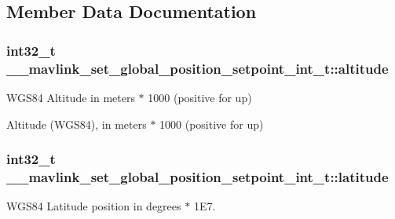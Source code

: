 \subsection{Member Data Documentation}
\hypertarget{struct____mavlink__set__global__position__setpoint__int__t_a5b6969b11abbf7cb228976942d8417b9}{
\subsubsection[{altitude}]{\setlength{\rightskip}{0pt plus 5cm}int32\+\_\+t \+\_\+\+\_\+mavlink\+\_\+set\+\_\+global\+\_\+position\+\_\+setpoint\+\_\+int\+\_\+t\+::altitude}}\label{struct____mavlink__set__global__position__setpoint__int__t_a5b6969b11abbf7cb228976942d8417b9}


W\+G\+S84 Altitude in meters $\ast$ 1000 (positive for up) 

Altitude (W\+G\+S84), in meters $\ast$ 1000 (positive for up) \hypertarget{struct____mavlink__set__global__position__setpoint__int__t_a5ce6831e10b85d86c1641ab5e1e7793f}{
\subsubsection[{latitude}]{\setlength{\rightskip}{0pt plus 5cm}int32\+\_\+t \+\_\+\+\_\+mavlink\+\_\+set\+\_\+global\+\_\+position\+\_\+setpoint\+\_\+int\+\_\+t\+::latitude}}\label{struct____mavlink__set__global__position__setpoint__int__t_a5ce6831e10b85d86c1641ab5e1e7793f}


W\+G\+S84 Latitude position in degrees $\ast$ 1\+E7. 

